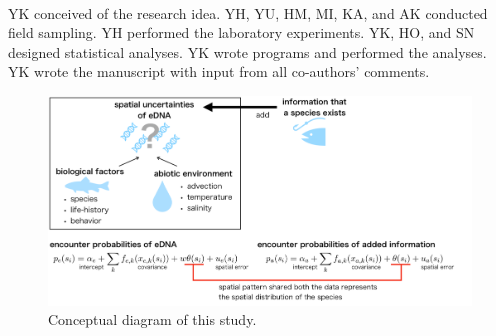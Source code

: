 \documentclass[12pt]{article}
\begin{document}
\begin{linenumbers}
\\
YK conceived of the research idea. YH, YU, HM, MI, KA, and AK conducted field sampling. YH performed the laboratory experiments. YK, HO, and SN designed statistical analyses. YK wrote programs and performed the analyses. YK wrote the manuscript with input from all co-authors' comments.
\ \\

\newpage
\begin{figure}[h]
  \centering
  \includegraphics[width = 18cm]{idea.png}
  \caption{Conceptual diagram of this study.}
\end{figure}



\end{linenumbers}
\end{document}
